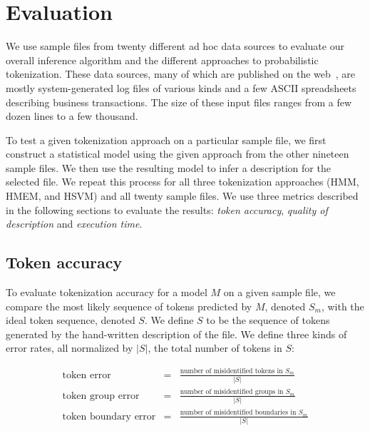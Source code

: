 \section{Evaluation}\label{sec:eval}
We use sample files from twenty different ad hoc data sources to
evaluate our overall inference algorithm and the different
approaches to probabilistic tokenization.  
These data sources, many of which are published on the
web~\cite{padsweb}, are mostly system-generated log files of various 
kinds and a few ASCII spreadsheets describing business transactions. 
The size of these input files ranges from a few dozen lines to a few
thousand.  

To test a given tokenization approach on a particular sample file, we
first construct a statistical model using the given approach from the
other nineteen sample files.  We then use the resulting model to infer a
description for the selected file.  We repeat this process for all
three tokenization approaches (HMM, HMEM, and HSVM) and all twenty
sample files.  We use three metrics described in the following
sections to evaluate the results: {\em token accuracy},
{\em quality of description} and {\em execution time}.

\subsection{Token accuracy}
To evaluate tokenization accuracy for a model $M$ on a given sample
file, we compare the most likely sequence of tokens predicted by $M$,
denoted $S_m$, with the ideal token sequence, denoted $S$.  We define
$S$ to be the sequence of tokens generated by the hand-written \pads{}
description of the file.  We define three kinds of error rates, all
normalized by $|S|$, the total number of tokens in $S$:

\begin{eqnarray*}
\textrm{token error} & = & \frac{\textrm{number of misidentified tokens in $S_m$}}
	{|S|} \\[1ex]
\textrm{token group error} & = & \frac{\textrm{number of misidentified groups in $S_m$}}
	{|S|}\\[1ex]
\textrm{token boundary error} & = & \frac{\textrm{number of misidentified boundaries in $S_m$}}
	{|S|}
\end{eqnarray*}

